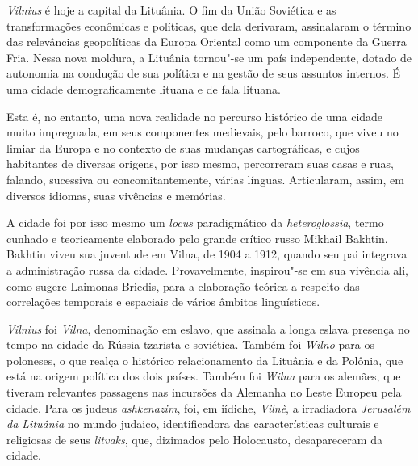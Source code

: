 \hfill{}
\bigskip
\bigskip
\bigskip

\begin{multicols}{2}


\noindent{}\textit{\textit{Vilnius}} é hoje a capital da Lituânia. O fim da União Soviética e as transformações econômicas e políticas, que dela derivaram, assinalaram o término das relevâncias geopolíticas da Europa Oriental como um componente da Guerra Fria. Nessa nova moldura, a Lituânia tornou"-se um país independente, dotado de autonomia na condução de sua política e na gestão de seus assuntos internos. É uma cidade demograficamente lituana e de fala lituana.

Esta é, no entanto, uma nova realidade no percurso histórico de uma
cidade muito impregnada, em seus componentes medievais, pelo barroco,
que viveu no limiar da Europa e no contexto de suas mudanças
cartográficas, e cujos habitantes de diversas origens, por isso mesmo,
percorreram suas casas e ruas, falando, sucessiva ou concomitantemente,
várias línguas. Articularam, assim, em diversos idiomas, suas vivências
e memórias.

A cidade foi por isso mesmo um \textit{locus} paradigmático da
\textit{heteroglossia}, termo cunhado e teoricamente elaborado pelo grande
crítico russo Mikhail Bakhtin. Bakhtin viveu sua juventude em Vilna, de
1904 a 1912, quando seu pai integrava a administração russa da cidade.
Provavelmente, inspirou"-se em sua vivência ali, como sugere Laimonas
Briedis, para a elaboração teórica a respeito das correlações temporais
e espaciais de vários âmbitos linguísticos.

\textit{\textit{Vilnius}} foi \textit{Vilna}, denominação em eslavo, que assinala a longa
eslava presença no tempo na cidade da Rússia tzarista e soviética.
Também foi \textit{Wilno} para os poloneses, o que realça o histórico
relacionamento da Lituânia e da Polônia, que está na origem política dos
dois países. Também foi \textit{Wilna} para os alemães, que tiveram relevantes
passagens nas incursões da Alemanha no Leste Europeu pela cidade. Para
os judeus \textit{ashkenazim}, foi, em iídiche, \textit{Vilnè}, a irradiadora
\textit{Jerusalém da Lituânia} no mundo judaico, identificadora das
características culturais e religiosas de seus \textit{litvaks}, que,
dizimados pelo Holocausto, desapareceram da cidade.


\end{multicols}
